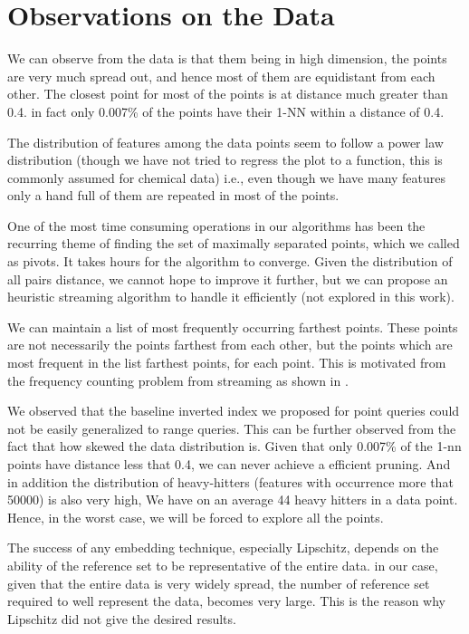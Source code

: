 \section{Observations on the Data}

We can observe from the data is that them being in high dimension, the points are very much spread out, and hence most of them are equidistant from each other.
The closest point for most of the points is at distance much greater than 0.4. in fact only 0.007\% of the points have their 1-NN within a distance of 0.4.

The distribution of features among the data points seem to follow a power law distribution (though we have not tried to regress the plot to a function, this is commonly assumed for chemical data)  i.e., even though we have many features only a hand full of them are repeated in most of the points.

One of the most time consuming operations in our algorithms has been the recurring theme of finding the set of maximally separated points, which we called as pivots. It takes hours for the algorithm to converge. Given the distribution of all pairs distance, we cannot hope to improve it further, but we can propose an heuristic streaming algorithm to handle it efficiently (not explored in this work).

We can maintain a list of most frequently occurring farthest points. These points are not necessarily the points farthest from each other, but the points which are most frequent in the list farthest points, for each point. This is motivated from the frequency counting problem from streaming as shown in \citet*{metwally2005efficient}.

We observed that the baseline inverted index we proposed for point queries could not be easily generalized  to range queries. This can be further observed from the fact that how skewed the data distribution is. Given that only 0.007\% of the 1-nn points have distance less that 0.4, we can never achieve a efficient pruning. And in addition the distribution of heavy-hitters (features with occurrence more that 50000) is also very high, We have on an average 44 heavy hitters in a data point. Hence, in the worst case, we will be forced to explore all the points.

The success of any embedding technique, especially Lipschitz, depends on the ability of the reference set to be representative of the entire data. in our case, given that the entire data is very widely spread, the number of reference set required to well represent the data, becomes very large. This is the reason why Lipschitz did not give the desired results.

